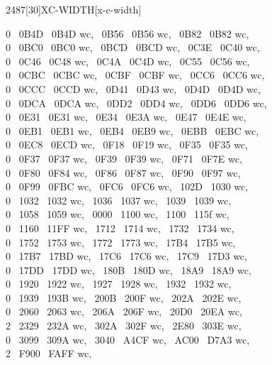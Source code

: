 \begin{worddef}{2487}[30]{XC-WIDTH}[x-c-width]
\begin{implement}
	0 ~0B4D ~0B4D wc, ~0B56 ~0B56 wc, ~0B82 ~0B82 wc,\\
	0 ~0BC0 ~0BC0 wc, ~0BCD ~0BCD wc, ~0C3E ~0C40 wc,\\
	0 ~0C46 ~0C48 wc, ~0C4A ~0C4D wc, ~0C55 ~0C56 wc,\\
	0 ~0CBC ~0CBC wc, ~0CBF ~0CBF wc, ~0CC6 ~0CC6 wc,\\
	0 ~0CCC ~0CCD wc, ~0D41 ~0D43 wc, ~0D4D ~0D4D wc,\\
	0 ~0DCA ~0DCA wc, ~0DD2 ~0DD4 wc, ~0DD6 ~0DD6 wc,\\
	0 ~0E31 ~0E31 wc, ~0E34 ~0E3A wc, ~0E47 ~0E4E wc,\\
	0 ~0EB1 ~0EB1 wc, ~0EB4 ~0EB9 wc, ~0EBB ~0EBC wc,\\
	0 ~0EC8 ~0ECD wc, ~0F18 ~0F19 wc, ~0F35 ~0F35 wc,\\
	0 ~0F37 ~0F37 wc, ~0F39 ~0F39 wc, ~0F71 ~0F7E wc,\\
	0 ~0F80 ~0F84 wc, ~0F86 ~0F87 wc, ~0F90 ~0F97 wc,\\
	0 ~0F99 ~0FBC wc, ~0FC6 ~0FC6 wc, ~102D ~1030 wc,\\
	0 ~1032 ~1032 wc, ~1036 ~1037 wc, ~1039 ~1039 wc,\\
	0 ~1058 ~1059 wc, ~0000 ~1100 wc, ~1100 ~115f wc,\\
	0 ~1160 ~11FF wc, ~1712 ~1714 wc, ~1732 ~1734 wc,\\
	0 ~1752 ~1753 wc, ~1772 ~1773 wc, ~17B4 ~17B5 wc,\\
	0 ~17B7 ~17BD wc, ~17C6 ~17C6 wc, ~17C9 ~17D3 wc,\\
	0 ~17DD ~17DD wc, ~180B ~180D wc, ~18A9 ~18A9 wc,\\
	0 ~1920 ~1922 wc, ~1927 ~1928 wc, ~1932 ~1932 wc,\\
	0 ~1939 ~193B wc, ~200B ~200F wc, ~202A ~202E wc,\\
	0 ~2060 ~2063 wc, ~206A ~206F wc, ~20D0 ~20EA wc,\\
	2 ~2329 ~232A wc, ~302A ~302F wc, ~2E80 ~303E wc,\\
	0 ~3099 ~309A wc, ~3040 ~A4CF wc, ~AC00 ~D7A3 wc,\\
	2 ~F900 ~FAFF wc,\tab[2]

\end{implement}
\end{worddef}
